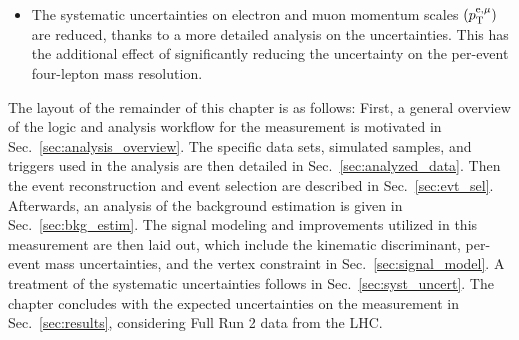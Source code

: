 \begin{itemize}
    \item The systematic uncertainties on electron and muon momentum scales $\left( p_{\mathrm{T}}^{\mathrm{e}, \mu} \right)$ are reduced, thanks to a more detailed analysis on the uncertainties.
    This has the additional effect of significantly reducing the uncertainty on the per-event four-lepton mass resolution.
\end{itemize}

The layout of the remainder of this chapter is as follows:
First, a general overview of the logic and analysis workflow for the \mH measurement is motivated in Sec.~\ref{sec:analysis_overview}.
The specific data sets, simulated samples, and triggers used in the analysis are then detailed in Sec.~\ref{sec:analyzed_data}.
Then the event reconstruction and event selection are described in Sec.~\ref{sec:evt_sel}.
Afterwards, an analysis of the background estimation is given in Sec.~\ref{sec:bkg_estim}.
The signal modeling and improvements utilized in this measurement are then laid out, which include the kinematic discriminant, per-event mass uncertainties, and the vertex constraint in Sec.~\ref{sec:signal_model}.
A treatment of the systematic uncertainties follows in Sec.~\ref{sec:syst_uncert}.
The chapter concludes with the expected uncertainties on the \mH measurement in Sec.~\ref{sec:results}, considering Full Run 2 data from the LHC.

